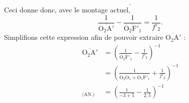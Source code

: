 \begin{enumerate}
\[		.\]
		Ceci donne donc, avec le montage actuel, \[
			\frac{1}{\overline{\mathrm{O_2A'}}} - \frac{1}{\overline{\mathrm{O_2F'_1}}} = \frac{1}{f'_2}
		.\]
		Simplifions cette expression afin de pouvoir extraire $\overline{\mathrm{O_2A'}}$ :
		\begin{align*}
			\overline{\mathrm{O_2A'}} &= \left( \frac{1}{\overline{\mathrm{O_2F'_1}}} - \frac{1}{f'_2} \right)^{-1} \\
			&= \left( \frac{1}{\overline{\mathrm{O_2O_1}} + \overline{\mathrm{O_1F'_1}}} + \frac{1}{f'_2}  \right)^{-1} \\
			{}_{\text{(AN.)}}&= \left( \frac{1}{-3 + 5} - \frac{1}{2{,}5} \right)^{-1} \\
		\end{align*}
\end{enumerate}
